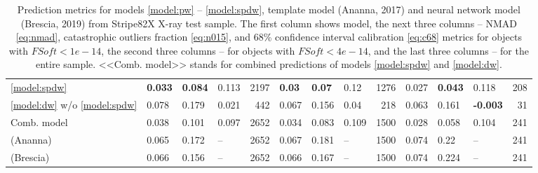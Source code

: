 \documentclass[fleqn,usenatbib]{mnras}
\begin{document}
\begin{table}
\begin{tabular}{llllrlllrlllr}
            \ref{model:spdw}                    &                    \textbf{0.033} &  \textbf{0.084} &            0.113 &        2197 &                     \textbf{0.03} &  \textbf{0.07} &             0.12 &        1276 &                            0.027 &  \textbf{0.043} &            0.118 &         208 \\
            \ref{model:dw} w/o \ref{model:spdw} &                             0.078 &           0.179 &            0.021 &         442 &                             0.067 &          0.156 &             0.04 &         218 &                            0.063 &           0.161 &  \textbf{-0.003} &          31 \\
            Comb. model                                  &                             0.038 &           0.101 &            0.097 &        2652 &                             0.034 &          0.083 &            0.109 &        1500 &                            0.028 &           0.058 &            0.104 &         241 \\
            (Ananna)                      &                             0.065 &           0.172 &           -- &        2652 &                             0.067 &          0.181 &           -- &        1500 &                            0.074 &            0.22 &           -- &         241 \\
            (Brescia)                            &                             0.066 &           0.156 &           -- &        2652 &                             0.066 &          0.167 &           -- &        1500 &                            0.074 &           0.224 &           -- &         241 \\
            \hline
            \end{tabular}
            \caption{Prediction metrics for models \ref{model:pw} -- \ref{model:spdw}, template model (Ananna, 2017) and neural network model (Brescia, 2019) from Stripe82X X-ray test sample. The first column shows model, the next three columns -- NMAD \eqref{eq:nmad}, catastrophic outliers fraction \eqref{eq:n015}, and 68\% confidence interval calibration \eqref{eq:c68} metrics for objects with $FSoft < 1e-14$, the second three columns -- for objects with $FSoft < 4e-14$, and the last three columns -- for the entire sample. <<Comb. model>> stands for combined predictions of models \ref{model:spdw} and \ref{model:dw}.}\label{tab:stripe82x-combined}
\end{table}
\end{document}
